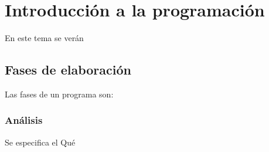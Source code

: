   \chapter{Introducción a la programación}
    En este tema se verán
    \section{Fases de elaboración}
      Las fases de un programa son:
      \subsection{Análisis}
         Se especifica el Qué